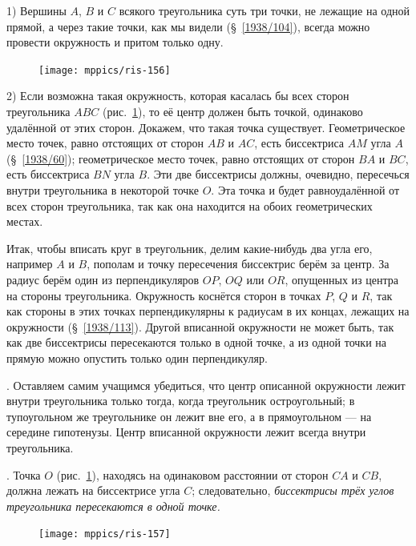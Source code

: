 \documentclass[oneside]{book}
\begin{document}
1) Вершины $A$, $B$ и $C$ всякого треугольника суть три точки, не лежащие на одной прямой, а через такие точки, как мы видели (§~\ref{1938/104}), всегда можно провести окружность и притом только одну.

\begin{figure}
\centering
\texttt{[image: mppics/ris-156]}
\caption{}\label{1938/ris-156}
\end{figure}

2) Если возможна такая окружность, которая касалась бы всех сторон треугольника $ABC$ (рис.~\ref{1938/ris-156}),
то её центр должен быть точкой, одинаково удалённой от этих сторон.
Докажем, что такая точка существует.
Геометрическое место точек, равно отстоящих от сторон $AB$ и $AC$, есть биссектриса $AM$ угла $A$ (§~\ref{1938/60});
геометрическое место точек, равно отстоящих от сторон $BA$ и $BC$, есть биссектриса $BN$ угла $B$.
Эти две биссектрисы должны, очевидно, пересечься внутри треугольника в некоторой точке $O$.
Эта точка и будет равноудалённой от всех сторон треугольника, так как она находится на обоих геометрических местах.

Итак, чтобы вписать круг в треугольник, делим какие-нибудь два угла его, например $A$ и $B$, пополам и точку пересечения биссектрис берём за центр.
За радиус берём один из перпендикуляров $OP$, $OQ$ или $OR$, опущенных из центра на стороны треугольника.
Окружность коснётся сторон в точках $P$, $Q$ и $R$, так как стороны в этих точках перпендикулярны к радиусам в их концах, лежащих на окружности (§~\ref{1938/113}).
Другой вписанной окружности не может быть, так как две биссектрисы пересекаются только в одной точке, а из одной точки на прямую можно опустить только один перпендикуляр.

{\sloppy 

.
Оставляем самим учащимся убедиться, что центр описанной окружности лежит внутри треугольника только тогда, когда треугольник остроугольный;
в тупоугольном же треугольнике он лежит вне его, а в прямоугольном — на середине гипотенузы.
Центр вписанной окружности лежит всегда внутри треугольника.

}

.
Точка $O$ (рис.~\ref{1938/ris-156}), находясь на одинаковом расстоянии от сторон $CA$ и $CB$, должна лежать на биссектрисе угла $C$;
следовательно, \emph{биссектрисы трёх углов треугольника пересекаются в одной точке.}

\begin{figure}
\centering
\texttt{[image: mppics/ris-157]}
\caption{}\label{1938/ris-157}
\end{figure}
\end{document}

